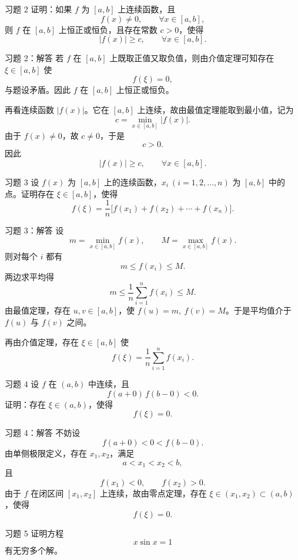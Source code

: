 ﻿\documentclass[aspectratio=169,11pt]{ctexbeamer}
\begin{document}
\begin{frame}{习题 2}
证明：如果 $f$ 为 $[a,b]$ 上连续函数，且
\[
  f(x)\neq 0,\qquad \forall x\in[a,b],
\]
则 $f$ 在 $[a,b]$ 上恒正或恒负，且存在常数 $c>0$，使得
\[
  |f(x)|\ge c,\qquad \forall x\in[a,b].
\]
\end{frame}

\begin{frame}{习题 2：解答}
若 $f$ 在 $[a,b]$ 上既取正值又取负值，则由介值定理可知存在 $\xi\in[a,b]$ 使
\[
  f(\xi)=0,
\]
与题设矛盾。因此 $f$ 在 $[a,b]$ 上恒正或恒负。
\vspace{0.5em}

再看连续函数 $|f(x)|$。它在 $[a,b]$ 上连续，故由最值定理能取到最小值，记为
\[
  c=\min_{x\in[a,b]}|f(x)|.
\]
由于 $f(x)\neq 0$，故 $c\neq 0$，于是
\[
  c>0.
\]
因此
\[
  |f(x)|\ge c,\qquad \forall x\in[a,b].
\]
\end{frame}

\begin{frame}{习题 3}
设 $f(x)$ 为 $[a,b]$ 上的连续函数，$x_i\ (i=1,2,\dots,n)$ 为 $[a,b]$ 中的点。证明存在 $\xi\in[a,b]$，使得
\[
  f(\xi)=\frac1n\bigl[f(x_1)+f(x_2)+\cdots+f(x_n)\bigr].
\]
\end{frame}

\begin{frame}{习题 3：解答}
设
\[
  m=\min_{x\in[a,b]}f(x),\qquad M=\max_{x\in[a,b]}f(x).
\]
则对每个 $i$ 都有
\[
  m\le f(x_i)\le M.
\]
两边求平均得
\[
  m\le \frac1n\sum_{i=1}^n f(x_i)\le M.
\]
由最值定理，存在 $u,v\in[a,b]$，使 $f(u)=m,\ f(v)=M$。于是平均值介于 $f(u)$ 与 $f(v)$ 之间。
\vspace{0.5em}

再由介值定理，存在 $\xi\in[a,b]$ 使
\[
  f(\xi)=\frac1n\sum_{i=1}^n f(x_i).
\]
\end{frame}

\begin{frame}{习题 4}
设 $f$ 在 $(a,b)$ 中连续，且
\[
  f(a+0)\,f(b-0)<0.
\]
证明：存在 $\xi\in(a,b)$，使得
\[
  f(\xi)=0.
\]
\end{frame}

\begin{frame}{习题 4：解答}
不妨设
\[
  f(a+0)<0<f(b-0).
\]
由单侧极限定义，存在 $x_1,x_2$，满足
\[
  a<x_1<x_2<b,
\]
且
\[
  f(x_1)<0,\qquad f(x_2)>0.
\]
由于 $f$ 在闭区间 $[x_1,x_2]$ 上连续，故由零点定理，存在 $\xi\in(x_1,x_2)\subset(a,b)$，使得
\[
  f(\xi)=0.
\]
\end{frame}

\begin{frame}{习题 5}
证明方程
\[
  x\sin x=1
\]
有无穷多个解。
\end{frame}
\end{document}
